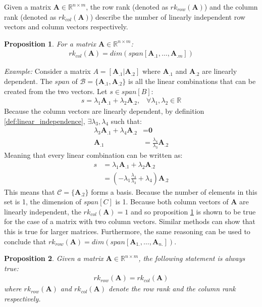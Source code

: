 \documentclass[a4paper,12pt]{book}
\newcommand{\set}[1]{\mathcal{#1}}
\newcommand{\matrx}[1]{\bm{#1}}
\newcommand{\vectr}[1]{\textbf{#1}}
\newcommand{\real}{\mathbb{R}}
\newcommand{\italic}[1]{\textit{#1}}
\newcommand{\rrank}[1]{rk_{row}(\matrx{#1})}
\newcommand{\crank}[1]{rk_{col}(\matrx{#1})}
\newtheorem{proposition}{Proposition}[section]
\begin{document}
	Given a matrix $ \matrx{A} \in \real^{n \times m} $, the row rank (denoted as $ \rrank{A} $) and the column rank (denoted as $ \crank{A} $) describe the number of linearly independent row vectors and column vectors respectively.
	\begin{proposition}
		\normalfont For a matrix $ \matrx{A} \in \real^{n \times m} $:
		\begin{align}
			\crank{A} = dim(span[\matrx{A}_{.1}, \ldots, \matrx{A}_{.m}])
		\end{align}
		\label{prop:c_rank_dim}
	\end{proposition}
	\noindent\italic{Example:}
	Consider a matrix $A = [\matrx{A}_{.1} | \matrx{A}_{.2}]$ where $ \matrx{A}_{.1} $ and $ \matrx{A}_{.2} $ are linearly dependent. The $ span $ of $\set{B} = \{\matrx{A}_{.1}, \matrx{A}_{.2}\} $ is all the linear combinations that can be created from the two vectors. Let $ s \in span[B] $:  
	\begin{align}
		s = \lambda_1 \matrx{A}_{.1} + \lambda_2 \matrx{A}_{.2}, \hspace{10pt}\forall \lambda_1, \lambda_2 \in \real
	\end{align}
	Because the column vectors are linearly dependent, by definition \ref{def:linear_independence}, 	$ \exists \lambda_3, \lambda_4$ such that: 
	\begin{align}
		\lambda_3 \matrx{A}_{.1} + \lambda_4 \matrx{A}_{.2} &= \vectr{0} \\
		\matrx{A}_{.1} &= \frac{\lambda_4}{\lambda_3} \matrx{A}_{.2}
	\end{align}
	Meaning that every linear combination can be written as:
	\begin{align}
		s &= \lambda_1 \matrx{A}_{.1} + \lambda_2 \matrx{A}_{.2} \\
		&= (-\lambda_1 \frac{\lambda_4}{\lambda_3} + \lambda_4) \matrx{A}_{.2}
	\end{align}
	This means that $ \set{C} = \{\matrx{A}_{.2}\} $ forms a basis. Because the number of elements in this set is 1, the dimension of $ span[C] $ is 1. Because both column vectors of $ \matrx{A} $ are linearly independent, the $ \crank{A} = 1$ and so proposition \ref{prop:c_rank_dim} is shown to be true for the case of a matrix with two column vectors. Similar methods can show that this is true for larger matrices. Furthermore, the same reasoning can be used to conclude that $ \rrank{\matrx{A}} = dim(span[\matrx{A}_{1.}, \ldots, \matrx{A}_{n.}]) $.
	\begin{proposition}
		\normalfont Given a matrix $ \matrx{A} \in \real^{n \times m}$, the following statement is always true:
		\begin{align}
			\rrank{A} = \crank{A}
			\label{eq:row_rank_col_rank}
		\end{align}
		where $ \rrank{A} $ and $ \crank{A} $ denote the row rank and the column rank respectively.
		\label{prop:row_rank_col_rank}
	\end{proposition}
	
\end{document}
